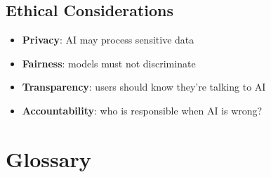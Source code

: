 \documentclass[11pt,a4paper]{report}
\begin{document}
\section{Ethical Considerations}

\begin{itemize}
    \item \textbf{Privacy}: AI may process sensitive data
    \item \textbf{Fairness}: models must not discriminate
    \item \textbf{Transparency}: users should know they're talking to AI
    \item \textbf{Accountability}: who is responsible when AI is wrong?
\end{itemize}

\chapter{Glossary}
\end{document}
